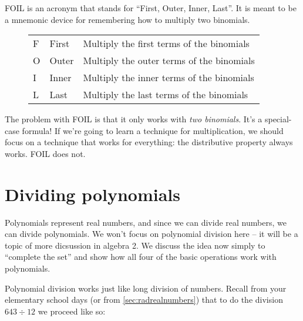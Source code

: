 FOIL is an acronym that stands for ``First, Outer, Inner, Last''. It is meant to be a mnemonic device for remembering how to multiply two binomials.

\begin{figure}
\begin{tabular}{lll}
F & First & Multiply the first terms of the binomials\\
O & Outer & Multiply the outer terms of the binomials\\
I & Inner & Multiply the inner terms of the binomials\\
L & Last & Multiply the last terms of the binomials
\end{tabular}

\vspace{3ex}

\end{figure}

The problem with FOIL is that it only works with \textit{two binomials}. It's a special-case formula! If we're going to learn a technique for multiplication, we should focus on a technique that works for everything: the distributive property always works. FOIL does not.

\section{Dividing polynomials}

Polynomials represent real numbers, and since we can divide real numbers, we can divide polynomials. We won't focus on polynomial division here -- it will be a topic of more dicsussion in algebra 2. We discuss the idea now simply to ``complete the set'' and show how all four of the basic operations work with polynomials.

Polynomial division works just like long division of numbers. Recall from your elementary school days (or from \cref{sec:radrealnumbers}) that to do the division $643\div12$ we proceed like so:

